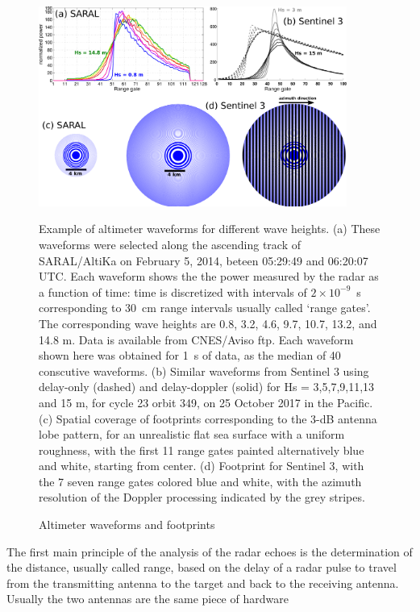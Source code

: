 \begin{figure}[htb]
\centerline{\includegraphics[width=0.9\textwidth]{FIGS_CH_SAT/dessin_footprint.pdf}}
  \caption{Altimeter waveforms and footprints}
    {Example of altimeter waveforms for different wave heights.}
    {(a) These waveforms were selected along the ascending track of SARAL/AltiKa on February 5, 2014, 
    beteen 05:29:49 and 06:20:07 UTC. Each waveform shows the the power measured by the radar as a function of time: 
    time is discretized with intervals of $2 \times 10^{-9}$~s corresponding to 
30~cm range intervals usually called `range gates'. The corresponding wave heights are 0.8, 3.2, 4.6, 9.7, 10.7, 13.2, and 14.8 m. 
Data is available from CNES/Aviso ftp. Each waveform shown here was obtained for 1~s of data, 
 as the median of 40 conscutive waveforms. (b) Similar waveforms from Sentinel 3 using delay-only (dashed) and delay-doppler (solid) for Hs = 3,5,7,9,11,13
and 15 m, for cycle 23 orbit 349, on 25 October 2017 in the Pacific. (c) Spatial coverage of footprints corresponding to the 3-dB antenna lobe pattern, for an 
unrealistic flat sea surface with a uniform roughness, with the first 11 range gates painted alternatively blue and white, 
starting from center. (d) Footprint for Sentinel 3, with the 7 seven range gates colored blue and white, with the azimuth resolution of the Doppler processing indicated by the grey stripes.
} \label{waveform}
\end{figure}
The first main principle of the analysis of the radar echoes is the determination  of the distance, usually called range, based on 
the delay of a radar pulse to travel from the transmitting antenna to the target and back to the receiving antenna. Usually the two antennas are the same piece of hardware 
